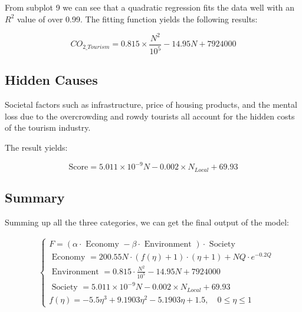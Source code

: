 \begin{figure}[H]
\begin{minipage}{0.33\textwidth}
    \end{minipage}
\end{figure}

From subplot 9 we can see that a quadratic regression 
fits the data well with an $R^2$ value of over 0.99.
The fitting function yields the following results:

\begin{equation}
    CO_{2\_Tourism} = 0.815 \times \frac{N^2}{10^5} - 14.95N+7924000
\end{equation}



\subsection{Hidden Causes}

Societal factors such as infrastructure, price of housing products, and the mental
loss due to the overcrowding and rowdy tourists all account for the hidden costs of the tourism industry.

The result yields:

\begin{equation}
    \text {Score}=5.011\times 10^{-9} N -0.002 \times N_{Local}+69.93
\end{equation}


\subsection{Summary}



Summing up all the three categories, we can get the final output of the model:

\begin{equation}
    \begin{aligned}
    &\left\{\begin{array}{l}
    F=(\alpha \cdot \text { Economy }-\beta \cdot \text { Environment }) \cdot \text { Society } \\[10pt]
    \text { Economy }=200.55 N \cdot(f(\eta)+1) \cdot (\eta+1)+NQ\cdot e^{-0.2 Q} \\[10pt]
    \text { Environment }=0.815 \cdot \frac{N^2}{10^5}-14.95 N+7924000 \\[10pt]
    \text { Society }=5.011\times 10^{-9} N -0.002 \times N_{Local}+69.93 \\[10pt]
    f(\eta)=-5.5 \eta^3+9.1903 \eta^2-5.1903 \eta+1.5, \quad 0 \leq \eta \leq 1
    \end{array}\right.
    \end{aligned}
\end{equation}

